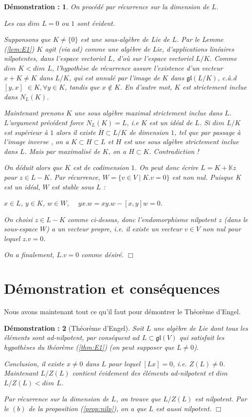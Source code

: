 \documentclass[a4paper,openany,12pt]{report}
\newcommand{\KK}{\mathbb{K}}
\newcommand{\gl}{\mathfrak{gl}}
\theoremstyle{break}
{\theorembodyfont{\upshape}
\newtheorem*{rmq}{Remarque :}
\newtheorem*{prv}{Preuve :}
\newtheorem*{ex}{Exemples :}
\newtheorem{exe}{Exemple : }
\newtheorem*{nota}{Notation :}}
\newtheorem*{dem}{D\'emonstration :}
\begin{document}
\begin{dem}
\quad On procédé par récurrence sur la dimension de $L$.

Les cas $dim$ $L = 0$ ou $1$ sont évident.

Supponsons que $K \neq \{0\}$ est une sous-algèbre de Lie de $L$. Par le Lemme (\ref{lem:E1}) $K$ agit (via $ad$) comme une algèbre de Lie, d'applications linéaires nilpotentes, dans l'espace vectoriel $L$, d'où sur l'espace vectoriel $L/K$. Comme $dim$ $K < dim$ $L$, l'hypothèse de récurrence assure l’existence d'un vecteur $x + K \neq K $ dans $L/K$, qui est annulé par l'image de $K$ dans $\gl(L/K)$, c.à.d $[y,x]$ $\in K, \forall y \in K$, tandis que $x \notin K$. En d'autre mot, $K$ est strictement inclue dans $N_{L}(K)$.

Maintenant prenons $K$ une sous algèbre maximal strictement inclue dans $L$. L'argument précédent force $N_{L}(K) = L$, i.e $K$ est un idéal de $L$. Si $dim$ $L/K$ est supérieur à $1$ alors il existe $\overline{H} \subset L/K$ de dimension $1$, tel que par passage à l'image inverse , on a $K \subset H \subset L$ et $H$ est une sous algèbre strictement inclue dans $L$. Mais par maximalisé de $K$, on a $H \subset K$. Contradiction !

On déduit alors que $K$ est de codimension $1$. On peut donc écrire $L=K+ \KK z$ pour $z \in L-K$.
Par récurrence, $W = \{ v \in V \mid K.v = 0\}$ est non nul. Puisque K est un idéal, $W$ est stable sous $L$ : 
\begin{center}
$x \in L$, $y \in K$, $w \in W$, $\quad yx.w = xy.w - [x,y]w =0$.
\end{center}
\quad On choisi $z \in L-K$ comme ci-dessus, donc l'endomorphisme nilpotent $z$ (dans le sous-espace $W$) a un vecteur propre, i.e. il existe un vecteur $v \in V$ non nul pour lequel $z.v = 0$.

On a finalement, $L.v = 0$ comme désiré. $\Box$
\end{dem}

\section{Démonstration et conséquences}

Nous avons maintenant tout ce qu'il faut pour démontrer le Théorème d'Engel.

\begin{dem}[Théorème d'Engel]
\quad Soit $L$ une algèbre de Lie dont tous les éléments sont ad-nilpotent, par conséquent $ad$ $L \subset \gl(V)$ qui satisfait les hypothèses du théorème (\ref{thm:E1}) (on peut supposer que $L \neq 0$).

Conclusion, il existe $x \neq 0$ dans $L$ pour lequel $[Lx]=0$, i.e. $Z(L) \neq 0$. Maintenant $L/Z(L)$ contient évidement des éléments ad-nilpotent et $dim$ $L/Z(L) < dim$ $L$.

Par récurrence sur la dimension de $L$, on  trouve que $L/Z(L)$ est nilpotent. Par le $(b)$ de la proposition (\ref{prop:nilp}), on a que $L$ est aussi nilpotent. $\Box$
\end{dem}
\end{document}
